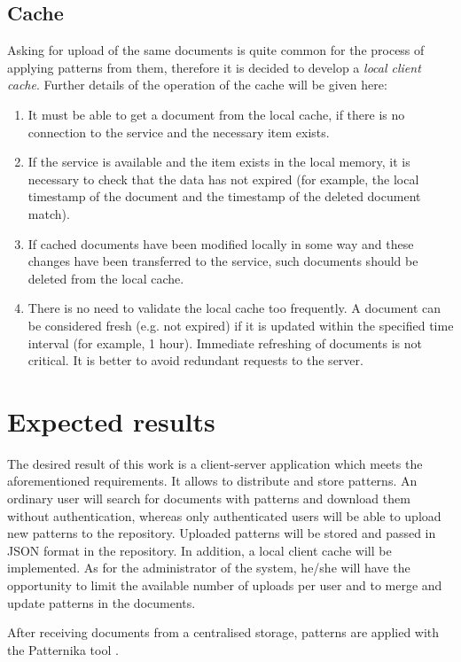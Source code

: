\documentclass[letterpaper, 10 pt, conference]{ieeeconf}  %
\begin{document}
\subsection{Cache}
Asking for upload of the same documents is quite common for the process of
applying patterns from them, therefore it is decided to develop a 
\emph{local client cache}. 
Further details of the operation of the cache will be given here:
\begin{enumerate}
    \item It must be able to get a document from the local cache, if there
    is no connection to the service and the necessary item exists.
    \item If the service is available and the item exists in the
    local memory, it is necessary to check that the data has not expired
    (for example, the local timestamp of the document and the timestamp of
    the deleted document match).
    \item If cached documents have been modified locally in some way
    and these changes have been transferred to the service, such documents
    should be deleted from the local cache.
    \item There is no need to validate the local cache too frequently.
    A document can be considered fresh (e.g. not expired) if it is
    updated within the specified time interval (for example, 1 hour).
    Immediate refreshing of documents is not critical. 
    It is better to avoid redundant requests to the server.
\end{enumerate}

\section{Expected results}
\label{section:results}

The desired result of this work is a client-server application which
meets the aforementioned requirements. 
It allows to distribute and store patterns.
An ordinary user will search for documents with patterns and download them
without authentication, whereas only authenticated users will be able to 
upload new patterns to the repository. 
Uploaded patterns will be stored and passed in JSON format in the repository.
In addition, a local client cache will be implemented.
As for the administrator of the system, he/she will have the opportunity to
limit the available number of uploads per user and to merge and update 
patterns in the documents. 

After receiving documents from a centralised storage, patterns are 
applied with the Patternika tool \cite{c1}. 
\end{document}
